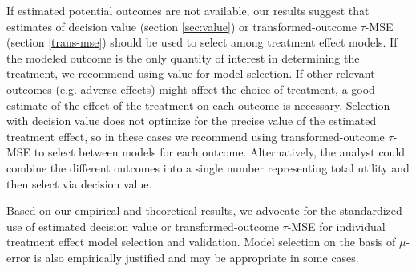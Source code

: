 If estimated potential outcomes are not available, our results suggest that estimates of decision value (section \ref{sec:value}) or transformed-outcome $\tau$-MSE (section \ref{trans-mse}) should be used to select among treatment effect models. If the modeled outcome is the only quantity of interest in determining the treatment, we recommend using value for model selection. If other relevant outcomes (e.g. adverse effects) might affect the choice of treatment, a good estimate of the effect of the treatment on each outcome is necessary. Selection with decision value does not optimize for the precise value of the estimated treatment effect, so in these cases we recommend using transformed-outcome $\tau$-MSE to select between models for each outcome. Alternatively, the analyst could combine the different outcomes into a single number representing total utility and then select via decision value.

Based on our empirical and theoretical results, we advocate for the standardized use of estimated decision value or transformed-outcome $\tau$-MSE for individual treatment effect model selection and validation. Model selection on the basis of $\mu$-error is also empirically justified and may be appropriate in some cases.